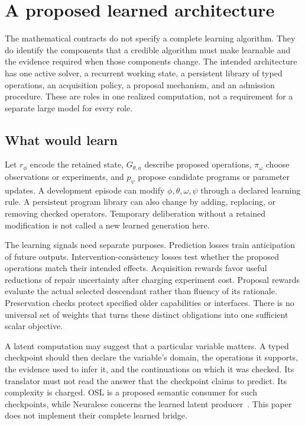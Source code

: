 \documentclass[11pt,letterpaper]{article}
\theoremstyle{plain}
\theoremstyle{definition}
\begin{document}
\section{A proposed learned architecture}\label{sec:architecture}
The mathematical contracts do not specify a complete learning algorithm. They do identify the components that a credible algorithm must make learnable and the evidence required when those components change. The intended architecture has one active solver, a recurrent working state, a persistent library of typed operations, an acquisition policy, a proposal mechanism, and an admission procedure. These are roles in one realized computation, not a requirement for a separate large model for every role.

\subsection{What would learn}
Let $r_\phi$ encode the retained state, $G_{\theta,a}$ describe proposed operations, $\pi_\omega$ choose observations or experiments, and $p_\psi$ propose candidate programs or parameter updates. A development episode can modify $\phi,\theta,\omega,\psi$ through a declared learning rule. A persistent program library can also change by adding, replacing, or removing checked operators. Temporary deliberation without a retained modification is not called a new learned generation here.

The learning signals need separate purposes. Prediction losses train anticipation of future outputs. Intervention-consistency losses test whether the proposed operations match their intended effects. Acquisition rewards favor useful reductions of repair uncertainty after charging experiment cost. Proposal rewards evaluate the actual selected descendant rather than fluency of its rationale. Preservation checks protect specified older capabilities or interfaces. There is no universal set of weights that turns these distinct obligations into one sufficient scalar objective.

A latent computation may suggest that a particular variable matters. A typed checkpoint should then declare the variable's domain, the operations it supports, the evidence used to infer it, and the continuations on which it was checked. Its translator must not read the answer that the checkpoint claims to predict. Its complexity is charged. OSL is a proposed semantic consumer for such checkpoints, while Neuralese concerns the learned latent producer~\cite{osl,neuralese}. This paper does not implement their complete learned bridge.
\end{document}
